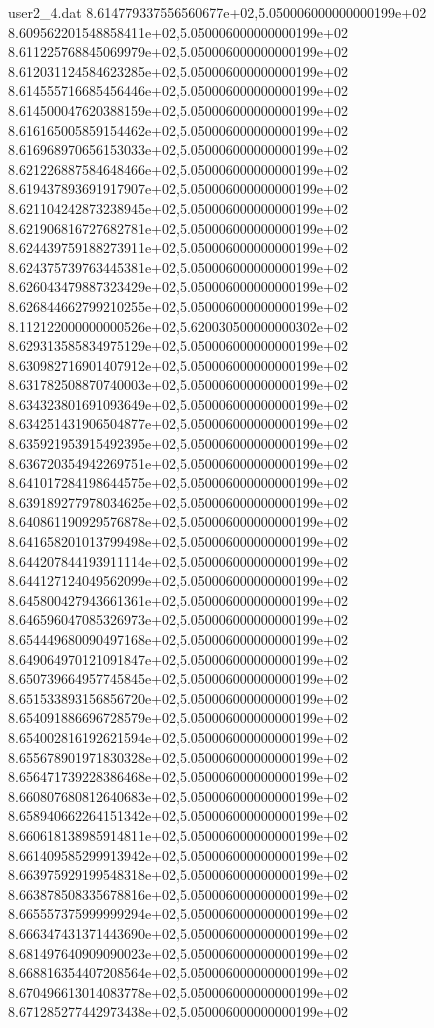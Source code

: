 \begin{filecontents}{user2_4.dat}
8.614779337556560677e+02,5.050006000000000199e+02
8.609562201548858411e+02,5.050006000000000199e+02
8.611225768845069979e+02,5.050006000000000199e+02
8.612031124584623285e+02,5.050006000000000199e+02
8.614555716685456446e+02,5.050006000000000199e+02
8.614500047620388159e+02,5.050006000000000199e+02
8.616165005859154462e+02,5.050006000000000199e+02
8.616968970656153033e+02,5.050006000000000199e+02
8.621226887584648466e+02,5.050006000000000199e+02
8.619437893691917907e+02,5.050006000000000199e+02
8.621104242873238945e+02,5.050006000000000199e+02
8.621906816727682781e+02,5.050006000000000199e+02
8.624439759188273911e+02,5.050006000000000199e+02
8.624375739763445381e+02,5.050006000000000199e+02
8.626043479887323429e+02,5.050006000000000199e+02
8.626844662799210255e+02,5.050006000000000199e+02
8.112122000000000526e+02,5.620030500000000302e+02
8.629313585834975129e+02,5.050006000000000199e+02
8.630982716901407912e+02,5.050006000000000199e+02
8.631782508870740003e+02,5.050006000000000199e+02
8.634323801691093649e+02,5.050006000000000199e+02
8.634251431906504877e+02,5.050006000000000199e+02
8.635921953915492395e+02,5.050006000000000199e+02
8.636720354942269751e+02,5.050006000000000199e+02
8.641017284198644575e+02,5.050006000000000199e+02
8.639189277978034625e+02,5.050006000000000199e+02
8.640861190929576878e+02,5.050006000000000199e+02
8.641658201013799498e+02,5.050006000000000199e+02
8.644207844193911114e+02,5.050006000000000199e+02
8.644127124049562099e+02,5.050006000000000199e+02
8.645800427943661361e+02,5.050006000000000199e+02
8.646596047085326973e+02,5.050006000000000199e+02
8.654449680090497168e+02,5.050006000000000199e+02
8.649064970121091847e+02,5.050006000000000199e+02
8.650739664957745845e+02,5.050006000000000199e+02
8.651533893156856720e+02,5.050006000000000199e+02
8.654091886696728579e+02,5.050006000000000199e+02
8.654002816192621594e+02,5.050006000000000199e+02
8.655678901971830328e+02,5.050006000000000199e+02
8.656471739228386468e+02,5.050006000000000199e+02
8.660807680812640683e+02,5.050006000000000199e+02
8.658940662264151342e+02,5.050006000000000199e+02
8.660618138985914811e+02,5.050006000000000199e+02
8.661409585299913942e+02,5.050006000000000199e+02
8.663975929199548318e+02,5.050006000000000199e+02
8.663878508335678816e+02,5.050006000000000199e+02
8.665557375999999294e+02,5.050006000000000199e+02
8.666347431371443690e+02,5.050006000000000199e+02
8.681497640909090023e+02,5.050006000000000199e+02
8.668816354407208564e+02,5.050006000000000199e+02
8.670496613014083778e+02,5.050006000000000199e+02
8.671285277442973438e+02,5.050006000000000199e+02

\end{filecontents}
